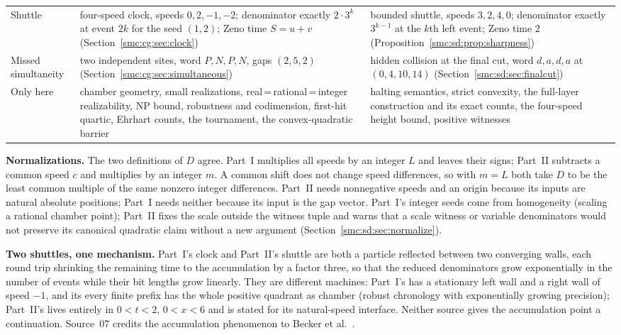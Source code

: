 \documentclass[11pt,letterpaper]{article}
\numberwithin{equation}{section}
\theoremstyle{definition}
\theoremstyle{remark}
\begin{document}
\begin{center}
\begin{longtable}{@{}L{0.2\textwidth}L{0.37\textwidth}L{0.37\textwidth}@{}}
Shuttle & four-speed clock, speeds $0,2,-1,-2$; denominator exactly $2\cdot3^k$ at event $2k$ for the seed $(1,2)$; Zeno time $S=u+v$ (Section~\ref{smc:cg:sec:clock}) & bounded shuttle, speeds $3,2,4,0$; denominator exactly $3^{k-1}$ at the $k$th left event; Zeno time $2$ (Proposition~\ref{smc:sd:prop:sharpness})\\
Missed simultaneity & two independent sites, word $P,N,P,N$, gaps $(2,5,2)$ (Section~\ref{smc:cg:sec:simultaneous}) & hidden collision at the final cut, word $d,a,d,a$ at $(0,4,10,14)$ (Section~\ref{smc:sd:sec:finalcut})\\
Only here & chamber geometry, small realizations, real\,=\,rational\,=\,integer realizability, NP bound, robustness and codimension, first-hit quartic, Ehrhart counts, the tournament, the convex-quadratic barrier & halting semantics, strict convexity, the full-layer construction and its exact counts, the four-speed height bound, positive witnesses\\
\bottomrule
\end{longtable}
\end{center}

\textbf{Normalizations.} The two definitions of $D$ agree. Part~I multiplies all speeds by an integer $L$ and leaves their signs; Part~II subtracts a common speed $c$ and multiplies by an integer $m$. A common shift does not change speed differences, so with $m=L$ both take $D$ to be the least common multiple of the same nonzero integer differences. Part~II needs nonnegative speeds and an origin because its inputs are natural absolute positions; Part~I needs neither because its input is the gap vector. Part~I's integer seeds come from homogeneity (scaling a rational chamber point); Part~II fixes the scale outside the witness tuple and warns that a scale witness or variable denominators would not preserve its canonical quadratic claim without a new argument (Section~\ref{smc:sd:sec:normalize}).

\textbf{Two shuttles, one mechanism.} Part~I's clock and Part~II's shuttle are both a particle reflected between two converging walls, each round trip shrinking the remaining time to the accumulation by a factor three, so that the reduced denominators grow exponentially in the number of events while their bit lengths grow linearly. They are different machines: Part~I's has a stationary left wall and a right wall of speed $-1$, and its every finite prefix has the whole positive quadrant as chamber (robust chronology with exponentially growing precision); Part~II's lives entirely in $0<t<2$, $0<x<6$ and is stated for its natural-speed interface. Neither source gives the accumulation point a continuation. Source~07 credits the accumulation phenomenon to Becker et al.~\cite{accumulations}.
\end{document}
